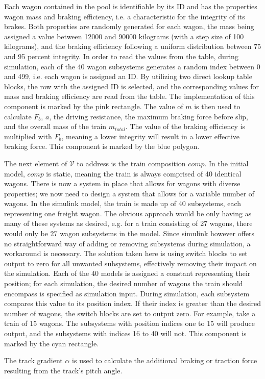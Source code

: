 \noindent
Each wagon contained in the pool is identifiable by its ID and has the properties wagon mass and braking efficiency, i.e. a characteristic for the integrity of its brakes. Both properties are randomly generated for each wagon, the mass being assigned a value between 12000 and 90000 kilograms (with a step size of 100 kilograms), and the braking efficiency following a uniform distribution between 75 and 95 percent integrity. In order to read the values from the table, during simulation, each of the 40 wagon subsystems generates a random index between 0 and 499, i.e. each wagon is assigned an ID. By utilizing two direct lookup table blocks, the row with the assigned ID is selected, and the corresponding values for mass and braking efficiency are read from the table. The implementation of this component is marked by the pink rectangle. The value of $m$ is then used to calculate $F_{b}$, $a$, the driving resistance, the maximum braking force before slip, and the overall mass of the train $m_{total}$. The value of the braking efficiency is multiplied with $F_{b}$, meaning a lower integrity will result in a lower effective braking force. This component is marked by the blue polygon.
\par
The next element of ${\mathcal{V}}$ to address is the train composition $comp$. In the initial model, $comp$ is static, meaning the train is always comprised of 40 identical wagons. There is now a system in place that allows for wagons with diverse properties; we now need to design a system that allows for a variable number of wagons. In the simulink model, the train is made up of 40 subsystems, each representing one freight wagon. The obvious approach would be only having as many of these systems as desired, e.g. for a train consisting of 27 wagons, there would only be 27 wagon subsystems in the model. Since simulink however offers no straightforward way of adding or removing subsystems during simulation, a workaround is necessary. The solution taken here is using switch blocks to set output to zero for all unwanted subsystems, effectively removing their impact on the simulation. Each of the 40 models is assigned a constant representing their position; for each simulation, the desired number of wagons the train should encompass is specified as simulation input. During simulation, each subsystem compares this value to its position index. If their index is greater than the desired number of wagons, the switch blocks are set to output zero. For example, take a train of 15 wagons. The subsystems with position indices one to 15 will produce output, and the subsystems with indices 16 to 40 will not. This component is marked by the cyan rectangle.
\par
The track gradient $\alpha$ is used to calculate the additional braking or traction force resulting from the track's pitch angle. 

